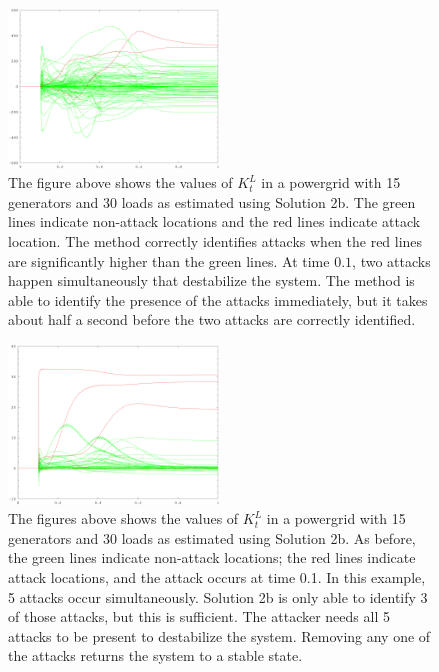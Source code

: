 \documentclass{article}
\begin{document}
\begin{figure}
\centering
\includegraphics[width=0.5\textwidth]{highP/highP-6}
\caption{
    The figure above shows the values of $K_t^L$ in a powergrid with 15 generators and 30 loads as estimated using Solution 2b.
    The green lines indicate non-attack locations and the red lines indicate attack location.
    The method correctly identifies attacks when the red lines are significantly higher than the green lines.
    At time $0.1$, two attacks happen simultaneously that destabilize the system.
    The method is able to identify the presence of the attacks immediately,
    but it takes about half a second before the two attacks are correctly identified.
}
\end{figure}

\begin{figure}
\centering
\includegraphics[width=0.5\textwidth]{highP/highP-6-5attack-zeros1}
\caption{
    The figures above shows the values of $K_t^L$ in a powergrid with 15 generators and 30 loads as estimated using Solution 2b.
    As before, the green lines indicate non-attack locations; the red lines indicate attack locations, and the attack occurs at time 0.1.
    In this example, 5 attacks occur simultaneously.
    Solution 2b is only able to identify 3 of those attacks,
    but this is sufficient.
    The attacker needs all 5 attacks to be present to destabilize the system.
    Removing any one of the attacks returns the system to a stable state.
}
\end{figure}
\end{document}
